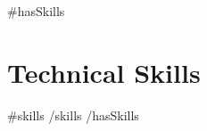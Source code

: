 {{#hasSkills}}
\section{Technical Skills}
\resumeSubHeadingListStart
  {{#skills}}
  {{/skills}}
\resumeSubHeadingListEnd
{{/hasSkills}}
